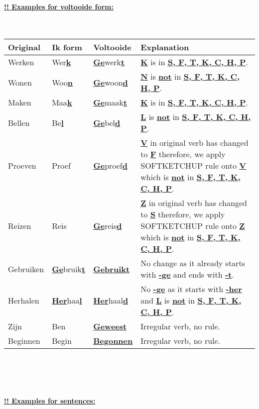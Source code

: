 \documentclass[a4paper,14pt]{extarticle}
\newcommand{\attention}[1]{\underline{\textbf{!! #1}}}
\newcommand{\emp}[1]{\underline{\textbf{#1}}}
\begin{document}
\hfill \\
\attention{Examples for voltooide form: } \\ \\ \\
\begin{tabularx}{\textwidth}{p{} p{} p{} p{}}
    \hline
    \textbf{Original} & \textbf{Ik form} & \textbf{Voltooide} & \textbf{Explanation} \\
    \hline
    Werken & Wer\emp{k} & \emp{Ge}werk\emp{t} & \emp{K} is in \emp{S, F, T, K, C, H, P}. \\
    Wonen & Woo\emp{n} & \emp{Ge}woon\emp{d} & \emp{N} is \emp{not} in \emp{S, F, T, K, C, H, P}. \\
    Maken & Maa\emp{k} & \emp{Ge}maak\emp{t} & \emp{K} is in \emp{S, F, T, K, C, H, P}. \\
    Bellen & Be\emp{l} & \emp{Ge}bel\emp{d} & \emp{L} is \emp{not} in \emp{S, F, T, K, C, H, P}. \\
    Proeven & Proef & \emp{Ge}proef\emp{d} & \emp{V} in original verb has changed to \emp{F} therefore, we apply SOFTKETCHUP rule onto \emp{V} which is \emp{not} in \emp{S, F, T, K, C, H, P}. \\
    Reizen & Reis & \emp{Ge}reis\emp{d} & \emp{Z} in original verb has changed to \emp{S} therefore, we apply SOFTKETCHUP rule onto \emp{Z} which is \emp{not} in \emp{S, F, T, K, C, H, P}. \\
    Gebruiken & \emp{Ge}bruik\emp{t} & \emp{Gebruikt} & No change as it already starts with \emp{-ge} and ends with \emp{-t}. \\
    Herhalen & \emp{Her}haa\emp{l} & \emp{Her}haal\emp{d} & No \emp{-ge} as it starts with \emp{-her} and \emp{L} is \emp{not} in \emp{S, F, T, K, C, H, P}. \\
    Zijn & Ben & \emp{Geweest} & Irregular verb, no rule. \\
    Beginnen & Begin & \emp{Begonnen} & Irregular verb, no rule. \\
\end{tabularx} \\ \\ \\ \\
\attention{Examples for sentences: } \\ \\ \\
\end{document}
